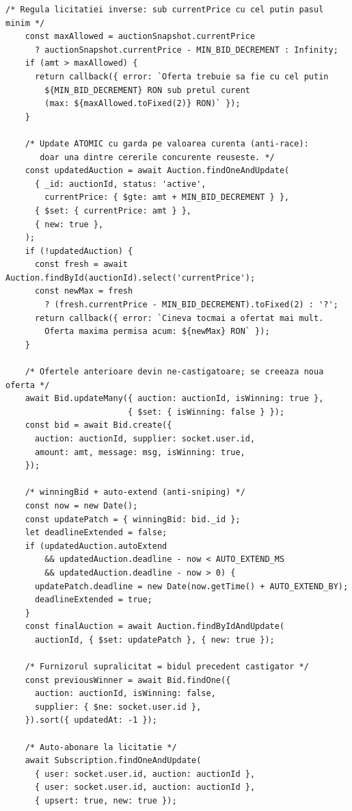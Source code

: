 \begin{appendices}
\begin{lstlisting}[caption={Handler-ul place\_bid (server/sockets/bidSocket.js, fără jurnalizare)},label={lst:place-bid-full}]
    /* Regula licitatiei inverse: sub currentPrice cu cel putin pasul minim */
    const maxAllowed = auctionSnapshot.currentPrice
      ? auctionSnapshot.currentPrice - MIN_BID_DECREMENT : Infinity;
    if (amt > maxAllowed) {
      return callback({ error: `Oferta trebuie sa fie cu cel putin
        ${MIN_BID_DECREMENT} RON sub pretul curent
        (max: ${maxAllowed.toFixed(2)} RON)` });
    }

    /* Update ATOMIC cu garda pe valoarea curenta (anti-race):
       doar una dintre cererile concurente reuseste. */
    const updatedAuction = await Auction.findOneAndUpdate(
      { _id: auctionId, status: 'active',
        currentPrice: { $gte: amt + MIN_BID_DECREMENT } },
      { $set: { currentPrice: amt } },
      { new: true },
    );
    if (!updatedAuction) {
      const fresh = await Auction.findById(auctionId).select('currentPrice');
      const newMax = fresh
        ? (fresh.currentPrice - MIN_BID_DECREMENT).toFixed(2) : '?';
      return callback({ error: `Cineva tocmai a ofertat mai mult.
        Oferta maxima permisa acum: ${newMax} RON` });
    }

    /* Ofertele anterioare devin ne-castigatoare; se creeaza noua oferta */
    await Bid.updateMany({ auction: auctionId, isWinning: true },
                         { $set: { isWinning: false } });
    const bid = await Bid.create({
      auction: auctionId, supplier: socket.user.id,
      amount: amt, message: msg, isWinning: true,
    });

    /* winningBid + auto-extend (anti-sniping) */
    const now = new Date();
    const updatePatch = { winningBid: bid._id };
    let deadlineExtended = false;
    if (updatedAuction.autoExtend
        && updatedAuction.deadline - now < AUTO_EXTEND_MS
        && updatedAuction.deadline - now > 0) {
      updatePatch.deadline = new Date(now.getTime() + AUTO_EXTEND_BY);
      deadlineExtended = true;
    }
    const finalAuction = await Auction.findByIdAndUpdate(
      auctionId, { $set: updatePatch }, { new: true });

    /* Furnizorul supralicitat = bidul precedent castigator */
    const previousWinner = await Bid.findOne({
      auction: auctionId, isWinning: false,
      supplier: { $ne: socket.user.id },
    }).sort({ updatedAt: -1 });

    /* Auto-abonare la licitatie */
    await Subscription.findOneAndUpdate(
      { user: socket.user.id, auction: auctionId },
      { user: socket.user.id, auction: auctionId },
      { upsert: true, new: true });


\end{lstlisting}
\end{appendices}
